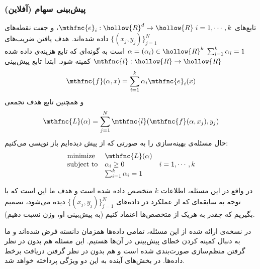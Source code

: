 \subsubsection{
پیش‌بینی سهام (آفلاین)
}
تابع‌های
$\mthfnc{e}_i : \hollow{R}^d \rightarrow \hollow{R} \; i=1,\cdots,k$،
و جفت نقطه‌های
$\{ (x_j, y_j) \}^{N}_{j=1}$
داده شده‌اند. هدف یافتن ضریب‌های
$\alpha = (\alpha_i) \in \hollow{R}^k \; \sum^{k}_{i=1} \alpha_i = 1$
است به گونه‌ای که تابع هزینه‌ی داده شده
$\mthfnc{l} : \hollow{R} \rightarrow \hollow{R}$
کمینه شود. ابتدا تابع پیش‌بینی
\[
\mthfnc{f}(\alpha, x) = \sum^{k}_{i=1} \alpha_i \mthfnc{e}_i(x)
\]
و همچنین تابع هدف تجمعی
\[
\mthfnc{L}(\alpha) = \sum^{N}_{j=1} \mthfnc{l} ( \mthfnc{f}(\alpha, x_j) , y_j )
\]
حال مسئله‌ی بهینه‌سازی را به صورتی که از پیش دیده‌ایم باز نویسی می‌کنیم:
\[
\begin{array}{lll}
\mbox{minimize} & \mthfnc{L}(\alpha) & \\
\mbox{subject to} & \alpha_i \geq 0 & i = 1,\cdots, k\\
& \sum^{k}_{i=1} \alpha_i = 1 &
\end{array}
\]

در واقع در این مسئله، اطلاعات
$k$
متخصص
داده شده است و هدف ما این است که با توجه به سابقه‌ای که از عملکرد در داده‌های
$\{ (x_j, y_j) \}^{N}_{j=1}$
دیده می‌شود، تصمیم بگیریم که چقدر به هریک از متخصص‌ها اعتماد کنیم (به پیش‌بینی او، وزن نسبت دهیم).

در نسخه‌ی ارائه شده از این مسئله، تمامی داده‌ها همزمان دانسته فرض شده‌اند و ما به دنبال کمینه کردن خطای پیش‌بینی در آن‌ها هستیم. این مسئله هم بدون در نظر گرفتن منظم‌سازی
صورت‌بندی شده است و هم بدون در نظر گرفتن دریافت برخط
داده‌ها. در بخش‌های آینده به این دو ویژگی پرداخته خواهد شد.

